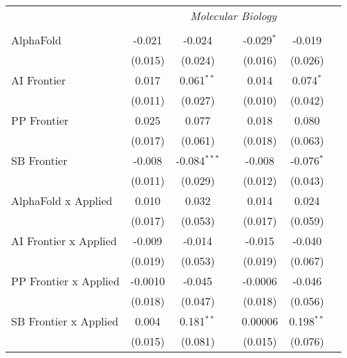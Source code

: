 \begin{tabular}{lcccccc}
 & \multicolumn{6}{c}{\textit{Molecular Biology}} \\ \\
   AlphaFold                      & -0.021  & -0.024         &               & -0.029$^{*}$ & -0.019       &   \\   
                                  & (0.015) & (0.024)        &               & (0.016)      & (0.026)      &   \\   
   AI Frontier                    & 0.017   & 0.061$^{**}$   &               & 0.014        & 0.074$^{*}$  &   \\   
                                  & (0.011) & (0.027)        &               & (0.010)      & (0.042)      &   \\   
   PP Frontier                    & 0.025   & 0.077          &               & 0.018        & 0.080        &   \\   
                                  & (0.017) & (0.061)        &               & (0.018)      & (0.063)      &   \\   
   SB Frontier                    & -0.008  & -0.084$^{***}$ &               & -0.008       & -0.076$^{*}$ &   \\   
                                  & (0.011) & (0.029)        &               & (0.012)      & (0.043)      &   \\   
   AlphaFold x Applied            & 0.010   & 0.032          &               & 0.014        & 0.024        &   \\   
                                  & (0.017) & (0.053)        &               & (0.017)      & (0.059)      &   \\   
   AI Frontier x Applied          & -0.009  & -0.014         &               & -0.015       & -0.040       &   \\   
                                  & (0.019) & (0.053)        &               & (0.019)      & (0.067)      &   \\   
   PP Frontier x Applied          & -0.0010 & -0.045         &               & -0.0006      & -0.046       &   \\   
                                  & (0.018) & (0.047)        &               & (0.018)      & (0.056)      &   \\   
   SB Frontier x Applied          & 0.004   & 0.181$^{**}$   &               & 0.00006      & 0.198$^{**}$ &   \\   
                                  & (0.015) & (0.081)        &               & (0.015)      & (0.076)      &   \\   

\end{tabular}

